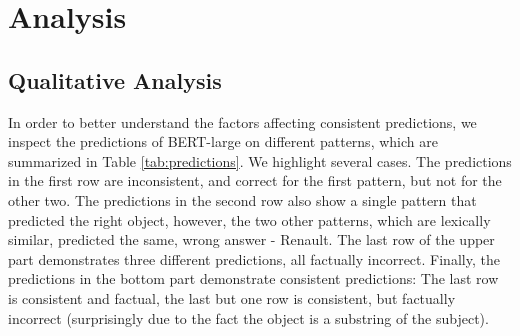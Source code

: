 \section{Analysis}
\label{sec:analysis}







\subsection{Qualitative Analysis}
In order to better understand the factors affecting consistent predictions, we inspect the predictions of BERT-large on different patterns, which are summarized in Table \ref{tab:predictions}.
We highlight several cases.
The predictions in the first row are inconsistent, and
correct for the first pattern, but not for the other two. 
The predictions in the second row also show a single pattern that predicted the right object, however, the two other patterns, which are lexically similar, predicted the same, wrong answer - Renault.
The last row of the upper part demonstrates three different predictions, all factually incorrect. 
Finally, the predictions in the bottom part demonstrate
consistent predictions:
The last row  is consistent and factual, the last but one
row is consistent, but factually incorrect (surprisingly due to the fact the object is a substring of the subject).





